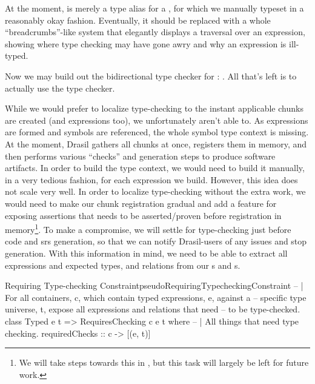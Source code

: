 At the moment,  is merely a type alias for a
, for which we manually typeset in a reasonably okay fashion.
Eventually, it should be replaced with a whole ``breadcrumbs''-like system that
elegantly displays a traversal over an expression, showing where type checking
may have gone awry and why an expression is ill-typed.

Now we may build out the bidirectional type checker for \Expr{}: . All that's left is to
actually use the type checker.

While we would prefer to localize type-checking to the instant applicable chunks
are created (and expressions too), we unfortunately aren't able to. As
expressions are formed and symbols are referenced, the whole symbol type context
is missing. At the moment, Drasil gathers all chunks at once, registers them in
memory, and then performs various ``checks'' and generation steps to produce
software artifacts. In order to build the type context, we would need to build
it manually, in a very tedious fashion, for each expression we build. However,
this idea does not scale very well. In order to localize type-checking without
the extra work, we would need to make our chunk registration gradual and add a
feature for exposing assertions that needs to be asserted/proven before
registration in memory\footnote{We will take steps towards this in
, but this task will largely be left for future work.}.
To make a compromise, we will settle for type-checking just before code and
\acs{srs} generation, so that we can notify Drasil-users of any issues and stop
generation. With this information in mind, we need to be able to extract all
expressions and expected types, and relations from our \InstanceModel{}s and
\DataDefinition{}s.

\begin{pseudohaskell}{Requiring Type-checking Constraint}{pseudoRequiringTypecheckingConstraint}
-- | For all containers, c, which contain typed expressions, e, against a
--   specific type universe, t, expose all expressions and relations that need 
--   to be type-checked.
class Typed e t => RequiresChecking c e t where
  -- | All things that need type checking.
  requiredChecks :: c -> [(e, t)]
\end{pseudohaskell}


